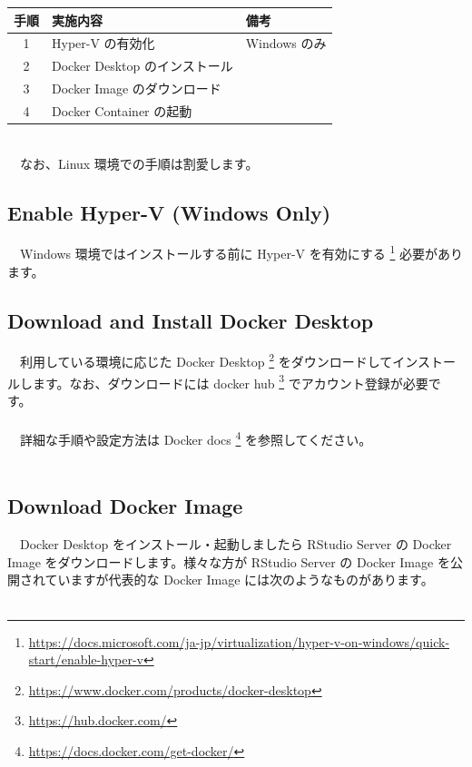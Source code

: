 \documentclass[
  12pt,
]{book}
\DeclareRobustCommand{\href}[2]{#2\footnote{\url{#1}}}
\begin{document}
\begin{longtable}[]{@{}cll@{}}
\toprule
手順 & 実施内容 & 備考 \\
\midrule
\endhead
1 & Hyper-V の有効化 & Windows のみ \\
2 & Docker Desktop のインストール & \\
3 & Docker Image のダウンロード & \\
4 & Docker Container の起動 & \\
\bottomrule
\end{longtable}

　\\
　なお、Linux 環境での手順は割愛します。 　

\hypertarget{enable-hyper-v-windows-only}{%
\subsection{Enable Hyper-V (Windows Only)}\label{enable-hyper-v-windows-only}}

　Windows 環境ではインストールする前に \href{https://docs.microsoft.com/ja-jp/virtualization/hyper-v-on-windows/quick-start/enable-hyper-v}{Hyper-V を有効にする } 必要があります。

\hypertarget{download-and-install-docker-desktop}{%
\subsection{Download and Install Docker Desktop}\label{download-and-install-docker-desktop}}

　利用している環境に応じた \href{https://www.docker.com/products/docker-desktop}{Docker Desktop } をダウンロードしてインストールします。なお、ダウンロードには \href{https://hub.docker.com/}{docker hub } でアカウント登録が必要です。\\
　\\
　詳細な手順や設定方法は \href{https://docs.docker.com/get-docker/}{Docker docs } を参照してください。\\
　

\hypertarget{download-docker-image}{%
\subsection{Download Docker Image}\label{download-docker-image}}

　Docker Desktop をインストール・起動しましたら RStudio Server の Docker Image をダウンロードします。様々な方が RStudio Server の Docker Image を公開されていますが代表的な Docker Image には次のようなものがあります。\\
　
\end{document}
